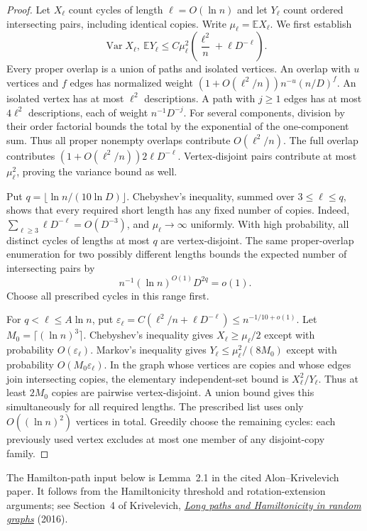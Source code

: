 \begin{proof}
Let $X_\ell$ count cycles of length $\ell=O(\ln n)$ and let $Y_\ell$ count ordered intersecting pairs, including identical copies.
Write $\mu_\ell=\mathbb EX_\ell$.
We first establish
\[
 \operatorname{Var}X_\ell,\ \mathbb EY_\ell
 \le C\mu_\ell^2\left(\frac{\ell^2}n+\ell D^{-\ell}\right).
\]
Every proper overlap is a union of paths and isolated vertices.
An overlap with $u$ vertices and $f$ edges has normalized weight $(1+O(\ell^2/n))n^{-u}(n/D)^f$.
An isolated vertex has at most $\ell^2$ descriptions.
A path with $j\ge1$ edges has at most $4\ell^2$ descriptions, each of weight $n^{-1}D^{-j}$.
For several components, division by their order factorial bounds the total by the exponential of the one-component sum.
Thus all proper nonempty overlaps contribute $O(\ell^2/n)$.
The full overlap contributes $(1+O(\ell^2/n))2\ell D^{-\ell}$.
Vertex-disjoint pairs contribute at most $\mu_\ell^2$, proving the variance bound as well.

Put $q=\lfloor\ln n/(10\ln D)\rfloor$.
Chebyshev's inequality, summed over $3\le\ell\le q$, shows that every required short length has any fixed number of copies.
Indeed, $\sum_{\ell\ge3}\ell D^{-\ell}=O(D^{-3})$, and $\mu_\ell\to\infty$ uniformly.
With high probability, all distinct cycles of lengths at most $q$ are vertex-disjoint.
The same proper-overlap enumeration for two possibly different lengths bounds the expected number of intersecting pairs by
\[
 n^{-1}(\ln n)^{O(1)}D^{2q}=o(1).
\]
Choose all prescribed cycles in this range first.

For $q<\ell\le A\ln n$, put $\varepsilon_\ell=C(\ell^2/n+\ell D^{-\ell})\le n^{-1/10+o(1)}$.
Let $M_0=\lceil(\ln n)^3\rceil$.
Chebyshev's inequality gives $X_\ell\ge\mu_\ell/2$ except with probability $O(\varepsilon_\ell)$.
Markov's inequality gives $Y_\ell\le\mu_\ell^2/(8M_0)$ except with probability $O(M_0\varepsilon_\ell)$.
In the graph whose vertices are copies and whose edges join intersecting copies, the elementary independent-set bound is $X_\ell^2/Y_\ell$.
Thus at least $2M_0$ copies are pairwise vertex-disjoint.
A union bound gives this simultaneously for all required lengths.
The prescribed list uses only $O((\ln n)^2)$ vertices in total.
Greedily choose the remaining cycles: each previously used vertex excludes at most one member of any disjoint-copy family.
\end{proof}

The Hamilton-path input below is Lemma~2.1 in the cited Alon--Krivelevich paper.
It follows from the Hamiltonicity threshold and rotation-extension arguments; see Section~4 of
Krivelevich, \href{https://arxiv.org/abs/1507.00205}{\emph{Long paths and Hamiltonicity in random graphs}} (2016).

